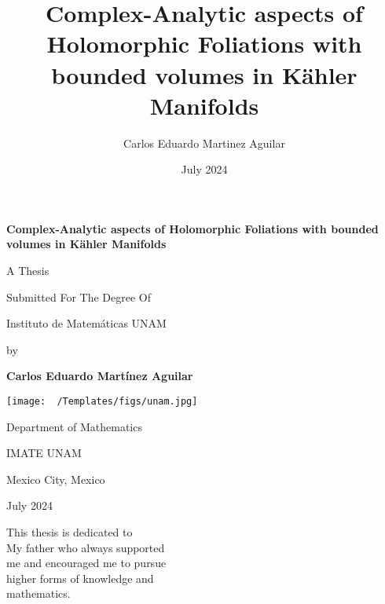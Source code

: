 \documentclass[12pt,twoside,a4paper]{report}
\author{Carlos Eduardo Martinez Aguilar}
\title{Complex-Analytic aspects of Holomorphic Foliations with bounded volumes in Kähler Manifolds}
\date{July 2024}
\newcommand{\thesistitle}{Complex-Analytic aspects of Holomorphic Foliations with bounded volumes in Kähler Manifolds}
\newcommand{\myname}{Carlos Eduardo Martínez Aguilar}
\newcommand{\thesisdate}{July 2024}
\begin{document}
\begin{titlepage}
    \centering
     {\huge \textbf{\thesistitle} \par}
      \vspace{2cm}
     {\large \sc A Thesis \par}
      \vspace{0.2cm}
     {\large \sc Submitted For The Degree Of \par}
     \vspace{0.2cm}
      {\large {} \par} 
     \vspace{0.2cm}
     {\large \sc Instituto de Matemáticas UNAM  \par}
     \vspace{1cm}
     {\large  by \par}
     \vspace{0.5cm}
     {\large \textbf{\myname} \par}
     \vspace{0.5cm}
    \texttt{[image: ~/Templates/figs/unam.jpg]}\\ %
    \vspace{2cm}
    {\large \sc Department of Mathematics\par}
     {\large \sc IMATE UNAM\par}
     {\large \sc Mexico City, Mexico\par}
    \vspace{0.5cm}
    {\large \sc\thesisdate\par}
    \vspace{2cm}
\end{titlepage}

\clearpage
\thispagestyle{empty}

\clearpage
\thispagestyle{empty}
\begin{center}
    \vspace*{\fill}
    This thesis is dedicated to\\
    My father who always supported\\
    me and encouraged me to pursue\\
    higher forms of knowledge and\\
    mathematics.
    \vspace*{\fill}
\end{center}
\clearpage
\end{document}
